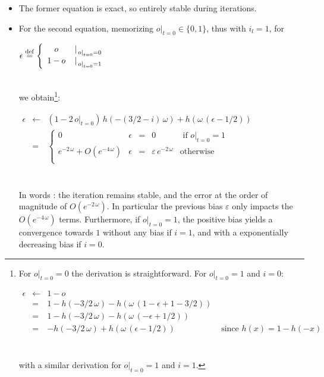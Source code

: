 \documentclass[a4]{article}
\newcommand{\eqline}[1]{~\vspace{0.1cm}\\\centerline{$#1$}\vspace{0.1cm}\\}
\newcommand{\defq}{\stackrel {\rm def}{=}}
\begin{document}
\begin{itemize}
  \item The former equation is exact, so entirely stable during iterations.
 \item For the second equation, memorizing $\left.o\right|_{t=0} \in \{0, 1 \}$, thus with $i_l = 1$, for
\eqline{\epsilon \defq \left\{\begin{array}{cc} o &\left.\right|_{\left.o\right|_{t=0} = 0} \\ 1 - o&\left.\right|_{\left.o\right|_{t=0} = 1} \end{array} \right.}
we obtain\footnote{
For $\left.o\right|_{t=0} = 0$ the derivation is straightforward. For $\left.o\right|_{t=0} = 1$ and $i = 0$:
\eqline{\begin{array}{rcll}
    \epsilon
    &\leftarrow& 1 - o \\
    &=& 1 - h(-3/2 \, \omega) - h( \omega \, (1 - \epsilon + 1 - 3/2)) \\
    &=& 1 - h(-3/2 \, \omega) - h( \omega \, (-\epsilon + 1/2)) \\
    &=& - h(-3/2 \, \omega) + h(\omega \, (\epsilon - 1/2)) & \mbox{ since $h(x) = 1 - h(-x)$} \\
  \end{array}} with a similar derivation for $\left.o\right|_{t=0} = 1$ and $i = 1$.}:
\eqline{\begin{array}{rcl}
    \epsilon &\leftarrow& (1 - 2 \, \left.o\right|_{t=0}) \,  h(-(3/2 - i) \, \omega) + h( \omega \, (\epsilon - 1/2)) \\
    &=& \left\{\begin{array}{lrcll}
      0 &\epsilon&=& 0 & \mbox{ if $\left.o\right|_{t=0} = 1$}\\
      e^{-2 \, \omega} + O\left(e^{-4 \, \omega}\right) &\epsilon&=& \varepsilon \, e^{-2 \, \omega}& \mbox{otherwise}\\
   \end{array}\right. \\
\end{array}}
In words : the iteration remains stable, and the error at the order of magnitude of $O\left(e^{-2 \, \omega}\right)$. In particular the previous bias $\varepsilon$ only impacts the $O\left(e^{-4 \, \omega}\right)$ terms. Furthermore, if $\left.o\right|_{t=0} = 1$, the positive bias yields a convergence towards $1$ without any bias if $i = 1$, and with a exponentially decreasing bias if 
$i = 0$.


\end{itemize}
\end{document}
